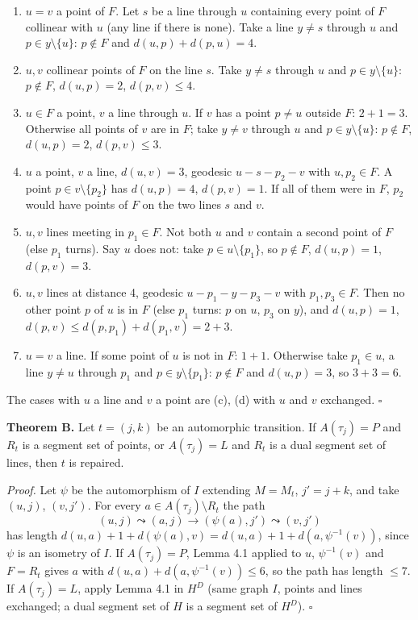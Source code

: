 \documentclass[
  11pt,
]{article}
\begin{document}
\begin{enumerate}
\def\labelenumi{(\alph{enumi})}
\item
  \(u = v\) a point of \(F\). Let \(s\) be a line through \(u\) containing every point of \(F\) collinear with \(u\)
  (any line if there is none). Take a line \(y\ne s\) through \(u\) and \(p\in y\setminus\{u\}\): \(p\notin F\) and
  \(d(u,p)+d(p,u) = 4\).
\item
  \(u, v\) collinear points of \(F\) on the line \(s\). Take \(y\ne s\) through \(u\) and \(p\in y\setminus\{u\}\):
  \(p\notin F\), \(d(u,p) = 2\), \(d(p,v)\le 4\).
\item
  \(u\in F\) a point, \(v\) a line through \(u\). If \(v\) has a point \(p\ne u\) outside \(F\): \(2+1 = 3\). Otherwise
  all points of \(v\) are in \(F\); take \(y\ne v\) through \(u\) and \(p\in y\setminus\{u\}\): \(p\notin F\),
  \(d(u,p) = 2\), \(d(p,v)\le 3\).
\item
  \(u\) a point, \(v\) a line, \(d(u,v) = 3\), geodesic \(u - s - p_2 - v\) with \(u, p_2\in F\). A point
  \(p\in v\setminus\{p_2\}\) has \(d(u,p) = 4\), \(d(p,v) = 1\). If all of them were in \(F\), \(p_2\) would have points
  of \(F\) on the two lines \(s\) and \(v\).
\item
  \(u, v\) lines meeting in \(p_1\in F\). Not both \(u\) and \(v\) contain a second point of \(F\) (else \(p_1\) turns).
  Say \(u\) does not: take \(p\in u\setminus\{p_1\}\), so \(p\notin F\), \(d(u,p) = 1\), \(d(p,v) = 3\).
\item
  \(u, v\) lines at distance 4, geodesic \(u - p_1 - y - p_3 - v\) with \(p_1, p_3\in F\). Then no other point \(p\) of
  \(u\) is in \(F\) (else \(p_1\) turns: \(p\) on \(u\), \(p_3\) on \(y\)), and \(d(u,p) = 1\),
  \(d(p,v)\le d(p,p_1)+d(p_1,v) = 2+3\).
\item
  \(u = v\) a line. If some point of \(u\) is not in \(F\): \(1+1\). Otherwise take \(p_1\in u\), a line \(y\ne u\)
  through \(p_1\) and \(p\in y\setminus\{p_1\}\): \(p\notin F\) and \(d(u,p) = 3\), so \(3+3 = 6\).
\end{enumerate}

The cases with \(u\) a line and \(v\) a point are (c), (d) with \(u\) and \(v\) exchanged. \(\square\)

\textbf{Theorem B.} Let \(t = (j,k)\) be an automorphic transition. If \(A(\tau_j) = P\) and \(R_t\) is a segment set of
points, or \(A(\tau_j) = L\) and \(R_t\) is a dual segment set of lines, then \(t\) is repaired.

\emph{Proof.} Let \(\psi\) be the automorphism of \(I\) extending \(M = M_t\), \(j' = j+k\), and take \((u,j)\),
\((v,j')\). For every \(a\in A(\tau_j)\setminus R_t\) the path \[(u,j)\leadsto(a,j)\to(\psi(a),j')\leadsto(v,j')\] has
length \(d(u,a) + 1 + d(\psi(a),v) = d(u,a) + 1 + d(a,\psi^{-1}(v))\), since \(\psi\) is an isometry of \(I\). If
\(A(\tau_j) = P\), Lemma 4.1 applied to \(u\), \(\psi^{-1}(v)\) and \(F = R_t\) gives \(a\) with
\(d(u,a)+d(a,\psi^{-1}(v))\le 6\), so the path has length \(\le 7\). If \(A(\tau_j) = L\), apply Lemma 4.1 in \(H^D\)
(same graph \(I\), points and lines exchanged; a dual segment set of \(H\) is a segment set of \(H^D\)). \(\square\)
\end{document}
